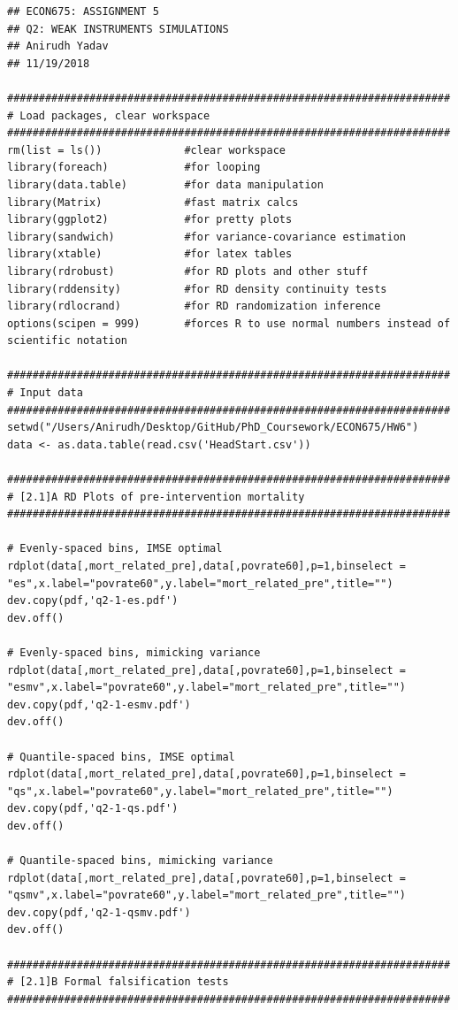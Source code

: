\documentclass[12pt]{article}
\begin{document}
\scriptsize
\begin{verbatim}
## ECON675: ASSIGNMENT 5
## Q2: WEAK INSTRUMENTS SIMULATIONS
## Anirudh Yadav 
## 11/19/2018

######################################################################
# Load packages, clear workspace
######################################################################
rm(list = ls())             #clear workspace
library(foreach)            #for looping
library(data.table)         #for data manipulation
library(Matrix)             #fast matrix calcs
library(ggplot2)            #for pretty plots
library(sandwich)           #for variance-covariance estimation 
library(xtable)             #for latex tables
library(rdrobust)           #for RD plots and other stuff
library(rddensity)          #for RD density continuity tests
library(rdlocrand)          #for RD randomization inference
options(scipen = 999)       #forces R to use normal numbers instead of scientific notation

######################################################################
# Input data
######################################################################
setwd("/Users/Anirudh/Desktop/GitHub/PhD_Coursework/ECON675/HW6")
data <- as.data.table(read.csv('HeadStart.csv'))

######################################################################
# [2.1]A RD Plots of pre-intervention mortality
######################################################################

# Evenly-spaced bins, IMSE optimal
rdplot(data[,mort_related_pre],data[,povrate60],p=1,binselect = "es",x.label="povrate60",y.label="mort_related_pre",title="")
dev.copy(pdf,'q2-1-es.pdf')
dev.off()

# Evenly-spaced bins, mimicking variance 
rdplot(data[,mort_related_pre],data[,povrate60],p=1,binselect = "esmv",x.label="povrate60",y.label="mort_related_pre",title="")
dev.copy(pdf,'q2-1-esmv.pdf')
dev.off()

# Quantile-spaced bins, IMSE optimal
rdplot(data[,mort_related_pre],data[,povrate60],p=1,binselect = "qs",x.label="povrate60",y.label="mort_related_pre",title="")
dev.copy(pdf,'q2-1-qs.pdf')
dev.off()

# Quantile-spaced bins, mimicking variance
rdplot(data[,mort_related_pre],data[,povrate60],p=1,binselect = "qsmv",x.label="povrate60",y.label="mort_related_pre",title="")
dev.copy(pdf,'q2-1-qsmv.pdf')
dev.off()

######################################################################
# [2.1]B Formal falsification tests
######################################################################


\end{verbatim}
\end{document}
